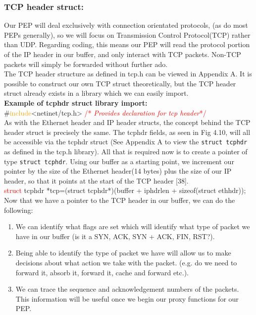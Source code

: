 \documentclass{uathesis}
\begin{document}
\subsubsection*{TCP header struct:}

Our PEP will deal exclusively with connection orientated protocols, (as do most PEPs generally), so we will focus on Transmission Control Protocol(TCP) rather than UDP. Regarding coding, this means our PEP will read the protocol portion of the IP header in our buffer, and only interact with TCP packets. Non-TCP packets will simply be forwarded without further ado.\\

The TCP header structure as defined in tcp.h can be viewed in Appendix A. It is possible to construct our own TCP struct theoretically, but the TCP header struct already exists in a library which we can easily import. \\

\noindent\textbf{Example of tcphdr struct library import:}\\
{\#}\textcolor{orange}{include}<netinet/tcp.h> \textcolor{red}{{\//*} \emph{Provides declaration for tcp header}{\/*/}} \\

As with the Ethernet header and IP header structs, the concept behind the TCP header struct is precisely the same. The tcphdr fields, as seen in Fig 4.10, will all be accessible via the tcphdr struct (See Appendix A to view the {\tt struct tcphdr} as defined in the tcp.h library). All that is required now is to create a pointer of type {\tt struct tcphdr}. Using our buffer as a starting point, we increment our pointer by the size of the Ethernet header(14 bytes) plus the size of our IP header, so that it points at the start of the TCP header [38].\\

\noindent \textcolor{red}{struct} tcphdr *tcp=(struct tcphdr*)(buffer + iphdrlen + sizeof(struct ethhdr)); \\

Now that we have a pointer to the TCP header in our buffer, we can do the following:\\

\begin{enumerate}
\item We can identify what flags are set which will identify what type of packet we have in our buffer (is it a SYN, ACK, SYN + ACK, FIN, RST?).
\item Being able to identify the type of packet we have will allow us to make decisions about what action we take with the packet. (e.g. do we need to forward it, absorb it, forward it, cache and forward etc.).
\item We can trace the sequence and acknowledgement numbers of the packets. This information will be useful once we begin our proxy functions for our PEP. \\
\end{enumerate}
\end{document}
